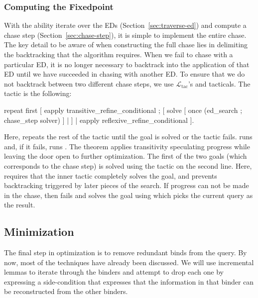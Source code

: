 \documentclass[preprint]{sigplanconf}
\newcommand{\ltac}[0]{\ensuremath{\mathcal{L}_{\mathrm{tac}}}}
\begin{document}
\subsubsection{Computing the Fixedpoint}
With the ability iterate over the EDs (Section~\ref{sec:traverse-ed}) and compute a chase step (Section~\ref{sec:chase-step}), it is simple to implement the entire chase.
The key detail to be aware of when constructing the full chase lies in delimiting the backtracking that the algorithm requires.
When we fail to chase with a particular ED, it is no longer necessary to backtrack into the application of that ED until we have succeeded in chasing with another ED.
To ensure that we do not backtrack between two different chase steps, we use \ltac's  and  tacticals.
The tactic is the following:
\begin{coq}
repeat first
   [ eapply transitive_refine_conditional ;
     [ solve [ once (ed_search ; chase_step solver) ]
     | ]
   | eapply reflexive_refine_conditional ].
\end{coq}
Here,  repeats the rest of the tactic until the goal is solved or the tactic fails.
 runs  and, if it fails, runs .
The  theorem applies transitivity speculating progress while leaving the door open to further optimization.
The first of the two goals (which corresponds to the chase step) is solved using the tactic on the second line.
Here,  requires that the inner tactic completely solves the goal, and  prevents backtracking triggered by later pieces of the search.
If progress can not be made in the chase, then  fails and  solves the goal using  which picks the current query as the result.


\subsection{Minimization}
\label{sec:minimization}

The final step in optimization is to remove redundant binds from the query.
By now, most of the techniques have already been discussed.
We will use incremental lemmas to iterate through the binders and attempt to drop each one by expressing a side-condition that expresses that the information in that binder can be reconstructed from the other binders.
\end{document}

